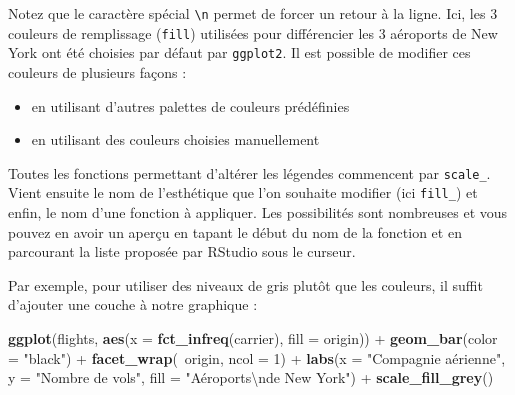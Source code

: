 \documentclass[a4paperpaper,]{article}
\newenvironment{Shaded}{\begin{snugshade}}{\end{snugshade}}
\newcommand{\CharTok}[1]{\textcolor[rgb]{0.57,0.30,0.62}{#1}}
\newcommand{\DataTypeTok}[1]{\textcolor[rgb]{0.00,0.34,0.68}{#1}}
\newcommand{\DecValTok}[1]{\textcolor[rgb]{0.69,0.50,0.00}{#1}}
\newcommand{\KeywordTok}[1]{\textcolor[rgb]{0.12,0.11,0.11}{\textbf{#1}}}
\newcommand{\NormalTok}[1]{\textcolor[rgb]{0.12,0.11,0.11}{#1}}
\newcommand{\OperatorTok}[1]{\textcolor[rgb]{0.12,0.11,0.11}{#1}}
\newcommand{\StringTok}[1]{\textcolor[rgb]{0.75,0.01,0.01}{#1}}
\providecommand{\tightlist}{%
  \setlength{\itemsep}{0pt}\setlength{\parskip}{0pt}}
\theoremstyle{definition}
\theoremstyle{definition}
\theoremstyle{definition}
\theoremstyle{remark}
\begin{document}
Notez que le caractère spécial \texttt{\textbackslash{}n} permet de
forcer un retour à la ligne. Ici, les 3 couleurs de remplissage
(\texttt{fill}) utilisées pour différencier les 3 aéroports de New York
ont été choisies par défaut par \texttt{ggplot2}. Il est possible de
modifier ces couleurs de plusieurs façons :

\begin{itemize}
\tightlist
\item
  en utilisant d'autres palettes de couleurs prédéfinies
\item
  en utilisant des couleurs choisies manuellement
\end{itemize}

Toutes les fonctions permettant d'altérer les légendes commencent par
\texttt{scale\_}. Vient ensuite le nom de l'esthétique que l'on souhaite
modifier (ici \texttt{fill\_}) et enfin, le nom d'une fonction à
appliquer. Les possibilités sont nombreuses et vous pouvez en avoir un
aperçu en tapant le début du nom de la fonction et en parcourant la
liste proposée par RStudio sous le curseur.

Par exemple, pour utiliser des niveaux de gris plutôt que les couleurs,
il suffit d'ajouter une couche à notre graphique :

\begin{Shaded}
\begin{Highlighting}[]
\KeywordTok{ggplot}\NormalTok{(flights, }\KeywordTok{aes}\NormalTok{(}\DataTypeTok{x =} \KeywordTok{fct_infreq}\NormalTok{(carrier), }\DataTypeTok{fill =}\NormalTok{ origin)) }\OperatorTok{+}
\StringTok{  }\KeywordTok{geom_bar}\NormalTok{(}\DataTypeTok{color =} \StringTok{"black"}\NormalTok{) }\OperatorTok{+}
\StringTok{  }\KeywordTok{facet_wrap}\NormalTok{(}\OperatorTok{~}\NormalTok{origin, }\DataTypeTok{ncol =} \DecValTok{1}\NormalTok{) }\OperatorTok{+}
\StringTok{  }\KeywordTok{labs}\NormalTok{(}\DataTypeTok{x =} \StringTok{"Compagnie aérienne"}\NormalTok{,}
       \DataTypeTok{y =} \StringTok{"Nombre de vols"}\NormalTok{,}
       \DataTypeTok{fill =} \StringTok{"Aéroports}\CharTok{\textbackslash{}n}\StringTok{de New York"}\NormalTok{) }\OperatorTok{+}
\StringTok{  }\KeywordTok{scale_fill_grey}\NormalTok{()}
\end{Highlighting}
\end{Shaded}
\end{document}
